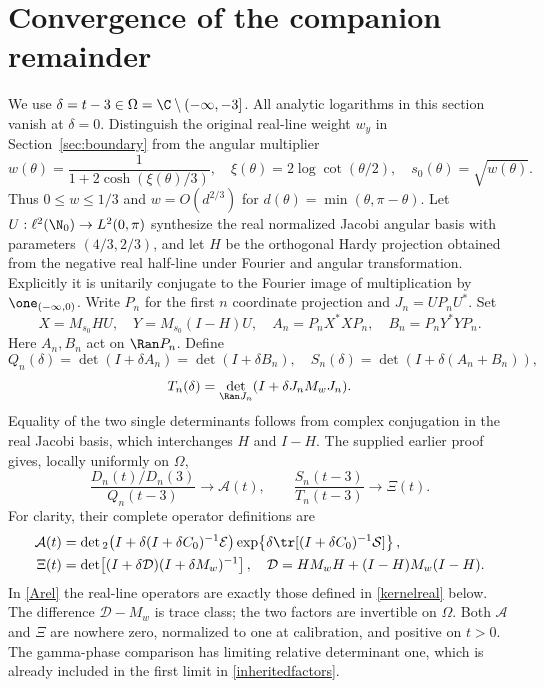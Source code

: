 \section{Convergence of the companion remainder}\label{sec:companion}
We use $\delta=t-3\in\Omega=\C\setminus(-\infty,-3]$.
All analytic logarithms in this section vanish at $\delta=0$.
Distinguish the original real-line weight $w_y$ in
Section~\ref{sec:boundary} from the angular multiplier
\begin{equation}\label{wang}
 w(\theta)=\frac1{1+2\cosh(\xi(\theta)/3)},\quad
 \xi(\theta)=2\log\cot(\theta/2),\quad s_0(\theta)=\sqrt{w(\theta)}.
\end{equation}
Thus $0\le w\le1/3$ and $w=O(d^{2/3})$ for
$d(\theta)=\min(\theta,\pi-\theta)$.
Let $U:\ell^2(\N_0)\to L^2(0,\pi)$ synthesize the real normalized
Jacobi angular basis with parameters $(4/3,2/3)$, and let $H$ be the
orthogonal Hardy projection obtained from the negative real half-line
under Fourier and angular transformation. Explicitly it is unitarily
conjugate to the Fourier image of multiplication by $\one_{(-\infty,0)}$.
Write $P_n$ for the first $n$ coordinate projection and $J_n=UP_nU^*$.
Set
\[
 X=M_{s_0}HU,\quad Y=M_{s_0}(I-H)U,\quad
 A_n=P_nX^*XP_n,\quad B_n=P_nY^*YP_n.
\]
Here $A_n,B_n$ act on $\Ran P_n$. Define
\[
 Q_n(\delta)=\det(I+\delta A_n)=\det(I+\delta B_n),\quad
 S_n(\delta)=\det(I+\delta(A_n+B_n)),
\]
\[
 T_n(\delta)=\det_{\Ran J_n}(I+\delta J_nM_wJ_n).
\]
Equality of the two single determinants follows from complex
conjugation in the real Jacobi basis, which interchanges $H$ and $I-H$.
The supplied earlier proof gives, locally uniformly on $\Omega$,
\begin{equation}\label{inheritedfactors}
 \frac{D_n(t)/D_n(3)}{Q_n(t-3)}\longrightarrow\mathcal A(t),
 \qquad \frac{S_n(t-3)}{T_n(t-3)}\longrightarrow\Xi(t).
\end{equation}
For clarity, their complete operator definitions are
\begin{align}
 \mathcal A(t)&=\det{}_2\!\left(I+\delta(I+\delta C_0)^{-1}\mathcal E\right)
 \exp\!\left\{\delta\tr[(I+\delta C_0)^{-1}\mathcal S]\right\},
 \label{Arel}\\
 \Xi(t)&=\det\!\left[(I+\delta\mathcal D)(I+\delta M_w)^{-1}\right],
 \quad \mathcal D=HM_wH+(I-H)M_w(I-H).
 \label{Xidef}
\end{align}
In \eqref{Arel} the real-line operators are exactly those defined in
\eqref{kernelreal} below. The difference $\mathcal D-M_w$ is trace
class; the two factors are invertible on $\Omega$. Both $\mathcal A$
and $\Xi$ are nowhere zero, normalized to one at calibration, and
positive on $t>0$. The gamma-phase comparison has limiting relative
determinant one, which is already included in the first limit in
\eqref{inheritedfactors}.

